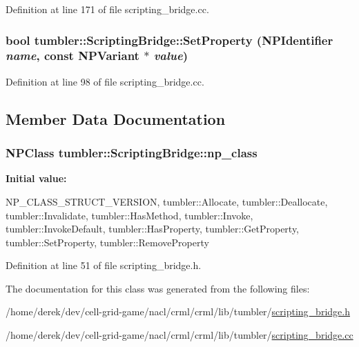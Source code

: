 Definition at line 171 of file scripting\_\-bridge.cc.

\hypertarget{classtumbler_1_1_scripting_bridge_a841486a4fe8e3245dd8d1711e2c72dd3}{
\subsubsection[{SetProperty}]{\setlength{\rightskip}{0pt plus 5cm}bool tumbler::ScriptingBridge::SetProperty (NPIdentifier {\em name}, \/  const NPVariant $\ast$ {\em value})}}
\label{classtumbler_1_1_scripting_bridge_a841486a4fe8e3245dd8d1711e2c72dd3}


Definition at line 98 of file scripting\_\-bridge.cc.



\subsection{Member Data Documentation}
\hypertarget{classtumbler_1_1_scripting_bridge_a4cd00d35febde2739ee85287f39981ac}{
\subsubsection[{np\_\-class}]{\setlength{\rightskip}{0pt plus 5cm}NPClass {\bf tumbler::ScriptingBridge::np\_\-class}}}
\label{classtumbler_1_1_scripting_bridge_a4cd00d35febde2739ee85287f39981ac}
{\bfseries Initial value:}
\begin{DoxyCode}
 {
  NP_CLASS_STRUCT_VERSION,
  tumbler::Allocate,
  tumbler::Deallocate,
  tumbler::Invalidate,
  tumbler::HasMethod,
  tumbler::Invoke,
  tumbler::InvokeDefault,
  tumbler::HasProperty,
  tumbler::GetProperty,
  tumbler::SetProperty,
  tumbler::RemoveProperty
}
\end{DoxyCode}


Definition at line 51 of file scripting\_\-bridge.h.



The documentation for this class was generated from the following files:\begin{DoxyCompactItemize}
\item 
/home/derek/dev/cell-\/grid-\/game/nacl/crml/crml/lib/tumbler/\hyperlink{lib_2tumbler_2scripting__bridge_8h}{scripting\_\-bridge.h}\item 
/home/derek/dev/cell-\/grid-\/game/nacl/crml/crml/lib/tumbler/\hyperlink{lib_2tumbler_2scripting__bridge_8cc}{scripting\_\-bridge.cc}\end{DoxyCompactItemize}
